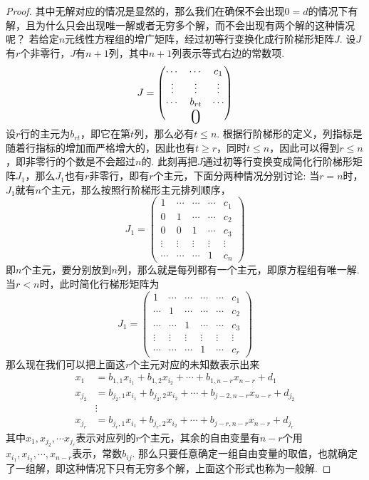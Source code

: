 \documentclass{article}
\newcommand\bigzero{\makebox(0,0){\text{\huge0}}} %
\begin{document}
\begin{proof}
其中无解对应的情况是显然的，那么我们在确保不会出现$0=d$的情况下有解，且为什么只会出现唯一解或者无穷多个解，而不会出现有两个解的这种情况呢？ 若给定$n$元线性方程组的增广矩阵，经过初等行变换化成行阶梯形矩阵$J$. 设$J$有$r$个非零行，$J$有$n+1$列，其中$n+1$列表示等式右边的常数项.
$$
J=
\begin{pmatrix}
\cdots & \cdots &c_1 \\
\vdots & \vdots & \vdots \\
\cdots & b_{rt} &\cdots \\
&\bigzero&
\end{pmatrix}
$$
设$r$行的主元为$b_{rt}$，即它在第$t$列，那么必有$t \leq n$. 根据行阶梯形的定义，列指标是随着行指标的增加而严格增大的，因此也有$t \geq r$，同时$t \leq n$，因此可以得到$r \leq n$，即非零行的个数是不会超过$n$的. 此刻再把$J$通过初等行变换变成简化行阶梯形矩阵$J_1$，那么$J_1$也有$r$非零行，即有$r$个主元，下面分两种情况分别讨论: {\color{red}当$r=n$时}，$J_1$就有$n$个主元，那么按照行阶梯形主元排列顺序，
$$
J_1 =
\begin{pmatrix}
1 & \cdots & \cdots &\cdots & c_1 \\
0 & 1 & \cdots & \cdots & c_2 \\
0 & 0 & 1 & \cdots & c_3 \\
\vdots & \vdots & \vdots & \vdots & \vdots \\
\cdots & \cdots & \cdots & 1 & c_n 
\end{pmatrix}
$$
即$n$个主元，要分别放到$n$列，那么就是每列都有一个主元，即原方程组有唯一解. {\color{red}当$r < n$时}，此时简化行梯形矩阵为
$$
J_1 =
\begin{pmatrix}
1 & \cdots & \cdots &\cdots & \cdots & c_1 \\
\cdots & 1 & \cdots & \cdots & \cdots & c_2 \\
\cdots & \cdots & 1 & \cdots & \cdots & c_3 \\
\vdots & \vdots & \vdots & \vdots & \vdots & \vdots \\
\cdots & \cdots & \cdots & 1 & \cdots & c_r 
\end{pmatrix}
$$
那么现在我们可以把上面这$r$个主元对应的未知数表示出来
$$
\begin{array}{ll}
x_1 &= b_{1,1}x_{i_1} + b_{1,2}x_{i_2} + \cdots + b_{1,n-r} x_{n-r} + d_1 \\
x_{j_2} &= b_{j_2,1}x_{i_1} + b_{j_2,2}x_{i_2} + \cdots + b_{j-2,n-r} x_{n-r} + d_{j_2} \\
&\vdots \\
x_{j_r} &= b_{j_r,1}x_{i_1} + b_{j_r,2}x_{i_2} + \cdots + b_{j-r,n-r} x_{n-r} + d_{j_r}
\end{array}
$$
其中$x_1,x_{j_2},\cdots x_{j_r}$表示对应列的$r$个主元，其余的自由变量有$n-r$个用$x_{i_1},x_{i_2},\cdots,x_{n-r}$表示，常数$b_{ij}$. 那么只要任意确定一组自由变量的取值，也就确定了一组解，即这种情况下只有无穷多个解，上面这个形式也称为{\color{red}一般解}.
\end{proof}
\end{document}
